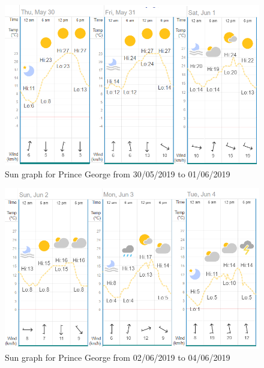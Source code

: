 \begin{figure}[h]
  \begin{center}
  \includegraphics[scale=.90]{images/figure96.png}
  \end{center}
  \caption{Sun graph for Prince George from 30/05/2019 to 01/06/2019  \cite{sunlight} }
\label{sun}

\end{figure}


\begin{figure}[h]
  \begin{center}
  \includegraphics[scale=.90]{images/figure97.png}
  \end{center}
  \caption{Sun graph for Prince George from 02/06/2019 to 04/06/2019  \cite{sunlight} }
  \label{sun1}

\end{figure}
